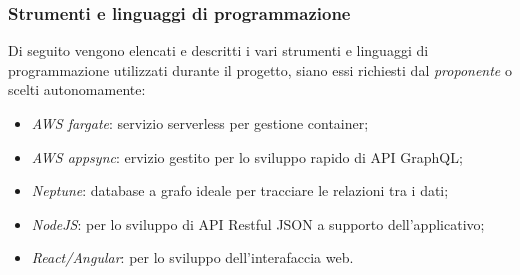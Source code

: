 \subsubsection{Strumenti e linguaggi di programmazione}
Di seguito vengono elencati e descritti i vari strumenti e linguaggi di programmazione utilizzati durante il progetto, siano essi richiesti dal \emph{proponente} o scelti autonomamente:
\begin{itemize}
	\item \emph{AWS fargate}: servizio serverless per gestione container;
	\item \emph{AWS appsync}: ervizio gestito per lo sviluppo rapido di API GraphQL;
	\item \emph{Neptune}: database a grafo ideale per tracciare le relazioni tra i dati; \\
	\item \emph{NodeJS}: per lo sviluppo di API Restful JSON a supporto dell'applicativo;
	\item \emph{React/Angular}: per lo sviluppo dell'interafaccia web. 
\end{itemize}
